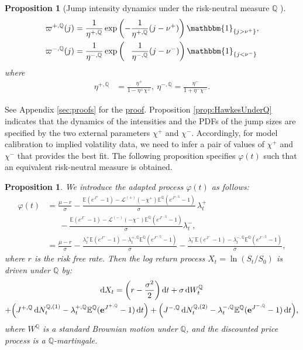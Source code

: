 \documentclass[11pt,a4paper]{article}
\numberwithin{equation}{section}
\newtheorem{proposition}[theorem]{Proposition}
\theoremstyle{remark}
\theoremstyle{definition}
\newcommand{\E}{{\mathbb{E}}}
\newcommand{\e}{{\bf e}}
\newcommand{\q}{{\mathbb Q}}
\newcommand{\dd}{{\rm d}}
\begin{document}
\begin{proposition}[Jump intensity dynamics under the risk-neutral measure $\q$ ]
    \begin{align*}
        \varpi^{+,\mathbb{Q}}(j) &= \frac{1}{\eta^{+, \mathbb{Q}}}\exp\left(-\frac{1}{\eta^{+, \mathbb{Q}}}(j-\nu^+)\right)\mathbbm{1}_{\{j > \nu^+\}},\\
        \varpi^{-,\mathbb{Q}}(j) &= \frac{1}{\eta^{-, \mathbb{Q}}}\exp\left(\phantom{-}\frac{1}{\eta^{-, \mathbb{Q}}}(j-\nu^-)\right)\mathbbm{1}_{\{j < \nu^-\}}
    \end{align*}
    where
    \begin{align}
        \eta^{+,\mathbb{Q}}
        &= \frac{\eta^+}{1-\eta^+\chi^+},\
        \eta^{-,\mathbb{Q}}
        = \frac{\eta^-}{1+\eta^-\chi^-}.
    \end{align}
\end{proposition}
See Appendix \ref{sec:proofs} for the \hyperref[proof:HawkesUnderQ]{proof}.
Proposition \ref{prop:HawkesUnderQ} indicates that the dynamics of the intensities and the PDFs of the jump sizes are specified by the two external parameters $\chi^+$ and $\chi^-$. Accordingly, for model calibration to implied volatility data, we need to infer a pair of values of $\chi^+$ and $\chi^-$ that provides the best fit.
The following proposition specifies $\varphi(t)$ such that an equivalent risk-neutral measure is obtained.
\begin{proposition}\label{prop:risk-neutralisation}
    We introduce the adapted process $\varphi(t)$ as follows:
    \begin{align}
      \label{eq:varphi2}
      \varphi(t)
      &= \frac{\mu - r}{\sigma}
      - \frac{ \E(e^{J^+}-1)
      - \mathcal{L}^{(+)}(-\chi^+)  \E^\mathbb{Q}(e^{J^{+,\q}}-1)}
        {\sigma}\, \lambda_t^+ \\
      &\phantom{=\,}
        - \frac{   \E(e^{J^-}-1)
        -\mathcal{L}^{(-)}(-\chi^-) \E^\mathbb{Q}(e^{J^{-,\q}}-1)
        } {\sigma }\lambda_t^-,\nonumber%
        \\[5pt]
      &= \frac{\mu - r}{\sigma} %
        - \frac{
        \lambda^{+}_t \E(e^{J^+}-1)
        - \lambda^{+,\mathbb{Q}}_t \E^\mathbb{Q}(e^{J^{+,\q}}-1)
        } {\sigma} %
        - \frac{
        \lambda^{-}_t \E(e^{J^-}-1)
        - \lambda^{-,\mathbb{Q}}_t \E^\mathbb{Q}(e^{J^{-,\q}}-1)
        } {\sigma },\nonumber
    \end{align}
    where $r$ is the risk free rate. Then the log return process $X_t=\ln (S_t/S_0)$ is driven under $\mathbb{Q}$ by:
    \begin{multline}
      \dd X_t   = \left(r-\frac{\sigma^2}{2}\right) \dd t + \sigma \,\dd W^{\mathbb{Q}}_t \\
       + \Big(J^{+, \mathbb{Q}}\, \dd N_t^{\mathbb{Q}, (1)} - \lambda_t^{+, \mathbb{Q}} \E^\mathbb{Q}(\e^{J^{+, \mathbb{Q}}}-1) \, \dd t\Big)
  + \Big(J^{-, \mathbb{Q}}\, \dd N_t^{\mathbb{Q}, (2)}- \lambda_t^{-, \mathbb{Q}}\E^\mathbb{Q}(\e^{J^{-, \mathbb{Q}}}-1)\, \dd t\Big), \label{eq:dxq}
  \end{multline}
    where $W^{\mathbb{Q}}$ is a standard Brownian motion under $\mathbb{Q}$, and the discounted price process is a $\mathbb Q$-martingale.
\end{proposition}
\end{document}

